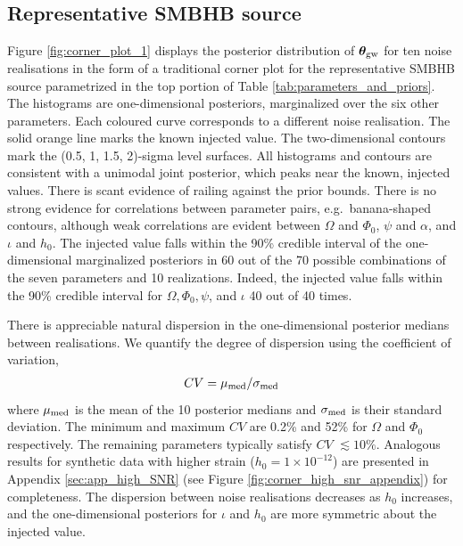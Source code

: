 \documentclass[fleqn,usenatbib,useAMS]{mnras}
\begin{document}
\subsection{Representative SMBHB source}\label{sec:rep_smbh_source}

Figure \ref{fig:corner_plot_1} displays the posterior distribution of $\boldsymbol{\theta}_{\rm gw}$ for ten noise realisations in the form of a traditional corner plot for the representative SMBHB source parametrized in the top portion of Table \ref{tab:parameters_and_priors}. The histograms are one-dimensional posteriors, marginalized over the six other parameters. Each coloured curve corresponds to a different noise realisation. The solid orange line marks the known injected value. The two-dimensional contours mark the (0.5, 1, 1.5, 2)-sigma level surfaces. All histograms and contours are consistent with a unimodal joint posterior, which peaks near the known, injected values. There is scant evidence of railing against the prior bounds. There is no strong evidence for correlations between parameter pairs, e.g.\ banana-shaped contours, although weak correlations are evident between $\Omega$ and $\Phi_0$, $\psi$ and $\alpha$, and $\iota$ and $h_0$. The injected value falls within the 90\% credible interval of the one-dimensional marginalized posteriors in 60 out of the 70 possible combinations of the seven parameters and 10 realizations. Indeed, the injected value falls within the 90\% credible interval for $\Omega, \Phi_0, \psi$, and  $\iota$ 40 out of 40 times. \newline  

There is appreciable natural dispersion in the one-dimensional posterior medians between realisations. We quantify the degree of dispersion using the coefficient of variation,
\begin{eqnarray}
	CV = \mu_{\rm med}/\sigma_{\rm med}
\end{eqnarray}
 where $\mu_{\rm med}$ is the mean of the 10 posterior medians and $\sigma_{\rm med}$ is their standard deviation. The minimum and maximum $CV$ are 0.2\% and 52\% for $\Omega$ and $\Phi_0$ respectively. The remaining parameters typically satisfy $CV$ $\lesssim 10 \%$. Analogous results for synthetic data with higher strain ($h_0 = 1 \times 10^{-12}$) are presented in Appendix \ref{sec:app_high_SNR} (see Figure \ref{fig:corner_high_snr_appendix}) for completeness. The dispersion between noise realisations decreases as $h_0$ increases, and the one-dimensional posteriors for $\iota$ and $h_0$ are more symmetric about the injected value. \newline 
\end{document}
